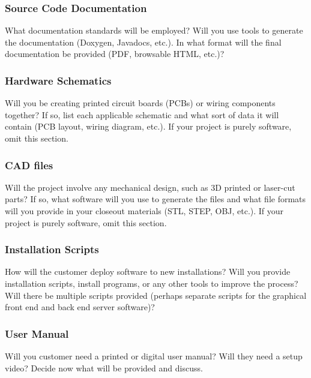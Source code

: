 \subsubsection{Source Code Documentation}
What documentation standards will be employed? Will you use tools to generate the documentation (Doxygen, Javadocs, etc.). In what format will the final documentation be provided (PDF, browsable HTML, etc.)?

\subsubsection{Hardware Schematics}
Will you be creating printed circuit boards (PCBs) or wiring components together? If so, list each applicable schematic and what sort of data it will contain (PCB layout, wiring diagram, etc.). If your project is purely software, omit this section.

\subsubsection{CAD files}
Will the project involve any mechanical design, such as 3D printed or laser-cut parts? If so, what software will you use to generate the files and what file formats will you provide in your closeout materials (STL, STEP, OBJ, etc.). If your project is purely software, omit this section.

\subsubsection{Installation Scripts}
How will the customer deploy software to new installations? Will you provide installation scripts, install programs, or any other tools to improve the process? Will there be multiple scripts provided (perhaps separate scripts for the graphical front end and back end server software)? 

\subsubsection{User Manual}
Will you customer need a printed or digital user manual? Will they need a setup video? Decide now what will be provided and discuss.
